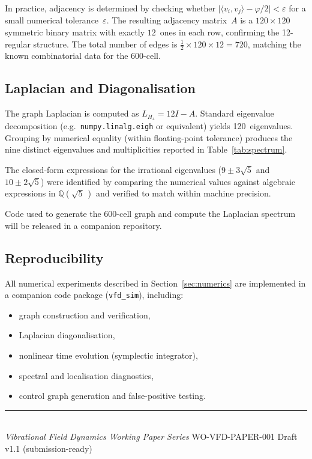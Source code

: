 \documentclass[12pt,a4paper]{article}
\newcommand{\vphi}{\varphi}
\newcommand{\Lmat}{L_{H_4}}
\newcommand{\Q}{\mathbb{Q}}
\begin{document}
In practice, adjacency is determined by checking whether
$\bigl|\langle v_i, v_j \rangle - \vphi/2\bigr| < \varepsilon$
for a small numerical tolerance~$\varepsilon$.  The resulting adjacency matrix~$A$ is a
$120 \times 120$ symmetric binary matrix with exactly $12$~ones in each row,
confirming the 12-regular structure.  The total number of edges is
$\tfrac{1}{2} \times 120 \times 12 = 720$, matching the known combinatorial
data for the 600-cell.

\subsection{Laplacian and Diagonalisation}

The graph Laplacian is computed as $\Lmat = 12I - A$.  Standard eigenvalue
decomposition (e.g.\ \texttt{numpy.linalg.eigh} or equivalent) yields
120~eigenvalues.  Grouping by numerical equality (within floating-point
tolerance) produces the nine distinct eigenvalues and multiplicities reported
in Table~\ref{tab:spectrum}.

The closed-form expressions for the irrational eigenvalues ($9 \pm 3\sqrt{5}$
and $10 \pm 2\sqrt{5}$) were identified by comparing the numerical values
against algebraic expressions in $\Q(\sqrt{5}\,)$ and verified to match within
machine precision.

Code used to generate the 600-cell graph and compute the Laplacian spectrum
will be released in a companion repository.

\subsection{Reproducibility}

All numerical experiments described in Section~\ref{sec:numerics} are
implemented in a companion code package (\texttt{vfd\_sim}), including:
\begin{itemize}[nosep]
\item graph construction and verification,
\item Laplacian diagonalisation,
\item nonlinear time evolution (symplectic integrator),
\item spectral and localisation diagnostics,
\item control graph generation and false-positive testing.
\end{itemize}

\vfill
\noindent\rule{\textwidth}{0.4pt}\\[4pt]
{\footnotesize
\textit{Vibrational Field Dynamics Working Paper Series}
\hfill WO-VFD-PAPER-001 \quad Draft v1.1 (submission-ready)}
\end{document}
